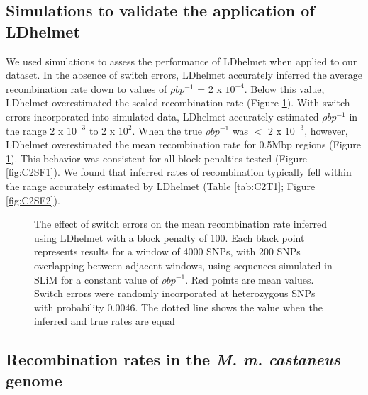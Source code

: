 \subsection{Simulations to validate the application of LDhelmet}

We used simulations to assess the performance of LDhelmet when applied to our dataset. In the absence of switch errors, LDhelmet accurately inferred the average recombination rate down to values of $\rho bp^{-1}$ = 2 x $10^{-4}$. Below this value, LDhelmet overestimated the scaled recombination rate (Figure \ref{fig:C2F1}). With switch errors incorporated into simulated data, LDhelmet accurately estimated $\rho bp^{-1}$ in the range 2 x $10^{-3}$ to 2 x $10^2$. When the true $\rho bp^{-1}$ was $<$ 2 x $10^{-3}$, however, LDhelmet overestimated the mean recombination rate for 0.5Mbp regions (Figure \ref{fig:C2F1}). This behavior was consistent for all block penalties tested (Figure \ref{fig:C2SF1}). We found that inferred rates of recombination typically fell within the range accurately estimated by LDhelmet (Table \ref{tab:C2T1}; Figure \ref{fig:C2SF2}).
 
  \begin{figure}[h]
   \centering      
   \noindent{}
 \caption[The effect of switch errors on recombination rate inference]{The effect of switch errors on the mean recombination rate inferred using LDhelmet with a block penalty of 100. Each black point represents results for a window of 4000 SNPs, with 200 SNPs overlapping between adjacent windows, using sequences simulated in SLiM for a constant value of $\rho bp^{-1}$. Red points are mean values. Switch errors were randomly incorporated at heterozygous SNPs with probability 0.0046. The dotted line shows the value when the inferred and true rates are equal}
\label{fig:C2F1}
\end{figure}

\subsection{Recombination rates in the \textit{\textit{M. m. castaneus}} genome}
 
